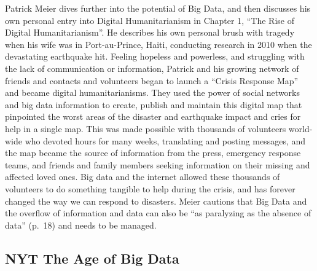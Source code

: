 \documentclass[]{book}
\theoremstyle{definition}
\theoremstyle{definition}
\theoremstyle{definition}
\theoremstyle{remark}
\begin{document}
Patrick Meier dives further into the potential of Big Data, and then
discusses his own personal entry into Digital Humanitarianism in Chapter
1, ``The Rise of Digital Humanitarianism''. He describes his own
personal brush with tragedy when his wife was in Port-au-Prince, Haiti,
conducting research in 2010 when the devastating earthquake hit. Feeling
hopeless and powerless, and struggling with the lack of communication or
information, Patrick and his growing network of friends and contacts and
volunteers began to launch a ``Crisis Response Map'' and became digital
humanitarianisms. They used the power of social networks and big data
information to create, publish and maintain this digital map that
pinpointed the worst areas of the disaster and earthquake impact and
cries for help in a single map. This was made possible with thousands of
volunteers world-wide who devoted hours for many weeks, translating and
posting messages, and the map became the source of information from the
press, emergency response teams, and friends and family members seeking
information on their missing and affected loved ones. Big data and the
internet allowed these thousands of volunteers to do something tangible
to help during the crisis, and has forever changed the way we can
respond to disasters. Meier cautions that Big Data and the overflow of
information and data can also be ``as paralyzing as the absence of
data'' (p.~18) and needs to be managed.

\hypertarget{nyt-the-age-of-big-data}{%
\subsection{\texorpdfstring{NYT \textbf{The Age of Big
Data}}{NYT The Age of Big Data}}\label{nyt-the-age-of-big-data}}
\end{document}
